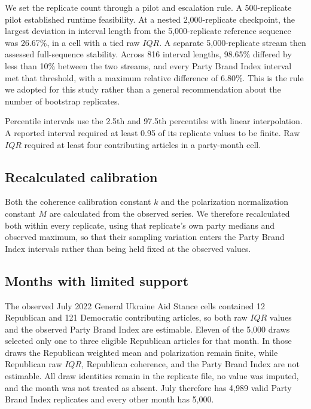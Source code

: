We set the replicate count through a pilot and escalation rule. A 500-replicate pilot established runtime feasibility. At a nested 2,000-replicate checkpoint, the largest deviation in interval length from the 5,000-replicate reference sequence was 26.67\%, in a cell with a tied raw $IQR$. A separate 5,000-replicate stream then assessed full-sequence stability. Across 816 interval lengths, 98.65\% differed by less than 10\% between the two streams, and every Party Brand Index interval met that threshold, with a maximum relative difference of 6.80\%. This is the rule we adopted for this study rather than a general recommendation about the number of bootstrap replicates.

Percentile intervals use the 2.5th and 97.5th percentiles with linear interpolation. A reported interval required at least 0.95 of its replicate values to be finite. Raw $IQR$ required at least four contributing articles in a party-month cell.

\subsection*{Recalculated calibration}

Both the coherence calibration constant $k$ and the polarization normalization constant $M$ are calculated from the observed series. We therefore recalculated both within every replicate, using that replicate's own party medians and observed maximum, so that their sampling variation enters the Party Brand Index intervals rather than being held fixed at the observed values.

\subsection*{Months with limited support}

The observed July 2022 General Ukraine Aid Stance cells contained 12 Republican and 121 Democratic contributing articles, so both raw $IQR$ values and the observed Party Brand Index are estimable. Eleven of the 5,000 draws selected only one to three eligible Republican articles for that month. In those draws the Republican weighted mean and polarization remain finite, while Republican raw $IQR$, Republican coherence, and the Party Brand Index are not estimable. All draw identities remain in the replicate file, no value was imputed, and the month was not treated as absent. July therefore has 4,989 valid Party Brand Index replicates and every other month has 5,000.

